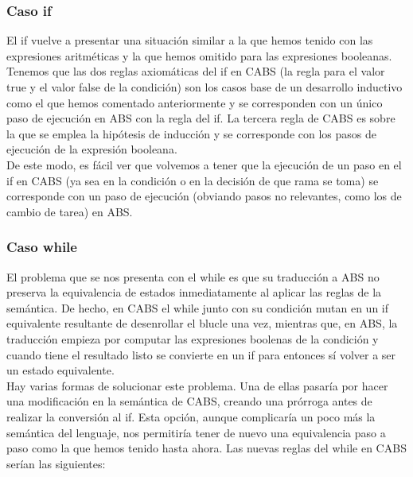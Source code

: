 \subsubsection{Caso if}
El if vuelve a presentar una situación similar a la que hemos tenido con las expresiones aritméticas y la que hemos omitido para las expresiones booleanas.\\

Tenemos que las dos reglas axiomáticas del if en CABS (la regla para el valor true y el valor false de la condición) son los casos base de un desarrollo inductivo como el que hemos comentado anteriormente y se corresponden con un único paso de ejecución en ABS con la regla del if. La tercera regla de CABS es sobre la que se emplea la hipótesis de inducción y se corresponde con los pasos de ejecución de la expresión booleana.\\

De este modo, es fácil ver que volvemos a tener que la ejecución de un paso en el if en CABS (ya sea en la condición o en la decisión de que rama se toma) se corresponde con un paso de ejecución (obviando pasos no relevantes, como los de cambio de tarea) en ABS.

\subsubsection{Caso while}
El problema que se nos presenta con el while es que su traducción a ABS no preserva la equivalencia de estados inmediatamente al aplicar las reglas de la semántica. De hecho, en CABS el while junto con su condición mutan en un if equivalente resultante de desenrollar el blucle una vez, mientras que, en ABS, la traducción empieza por computar las expresiones boolenas de la condición y cuando tiene el resultado listo se convierte en un if para entonces sí volver a ser un estado equivalente.\\

Hay varias formas de solucionar este problema. Una de ellas pasaría por hacer una modificación en la semántica de CABS, creando una prórroga antes de realizar la conversión al if. Esta opción, aunque complicaría un poco más la semántica del lenguaje, nos permitiría tener de nuevo una equivalencia paso a paso como la que hemos tenido hasta ahora. Las nuevas reglas del while en CABS serían las siguientes:


